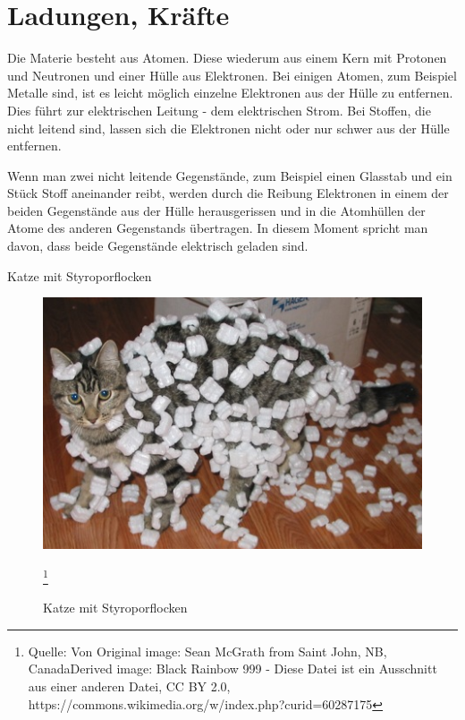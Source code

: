 \documentclass[aspectratio=169, ignorenonframetext]{beamer}
\begin{document}
\section{Ladungen, Kräfte}
Die Materie besteht aus Atomen. Diese wiederum aus einem Kern mit Protonen und Neutronen und einer Hülle aus Elektronen. Bei einigen Atomen, zum Beispiel Metalle sind, ist es leicht möglich einzelne Elektronen aus der Hülle zu entfernen. Dies führt zur elektrischen Leitung - dem elektrischen Strom. Bei Stoffen, die nicht leitend sind, lassen sich die Elektronen nicht oder nur schwer aus der Hülle entfernen.

Wenn man zwei nicht leitende Gegenstände, zum Beispiel einen Glasstab und ein Stück Stoff aneinander reibt, werden durch die Reibung Elektronen in einem der beiden Gegenstände aus der Hülle herausgerissen und in die Atomhüllen der Atome des anderen Gegenstands übertragen. In diesem Moment spricht man davon, dass beide Gegenstände elektrisch geladen sind.
\begin{frame}{Katze mit Styroporflocken}
  \begin{figure}[htb]
    \includegraphics{Cat_demonstrating_static_cling_with_styrofoam_peanuts.jpeg}
    \caption{Katze mit Styroporflocken}
    \label{abb:CatWidthStyropor}
    \footnote{Quelle: Von Original image: Sean McGrath from Saint John, NB, CanadaDerived image: Black Rainbow 999 - Diese Datei ist ein Ausschnitt aus einer anderen Datei, CC BY 2.0, https://commons.wikimedia.org/w/index.php?curid=60287175}
  \end{figure}
\end{frame}
\end{document}
